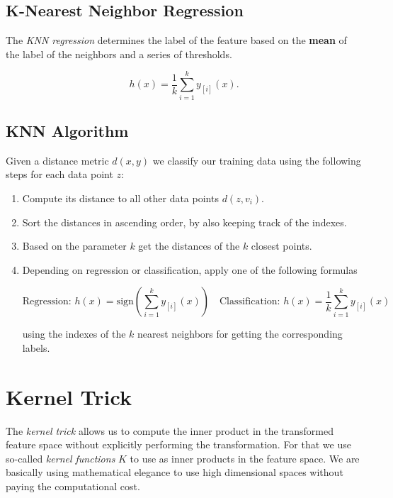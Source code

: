 \subsection{K-Nearest Neighbor Regression}

The \emph{KNN regression} determines the label of the feature based on the \textbf{mean} of the
label of the neighbors and a series of thresholds.

\[
	h(x) = \frac{1}{k} \sum_{i = 1}^{k} y_{[i]}(x).
\]

\subsection{KNN Algorithm}

Given a distance metric \(d(x, y)\) we classify our training data using the following steps for each data point \(z\):

\begin{enumerate}

	\item Compute its distance to all other data points \(d(z, v_i)\).

	\item Sort the distances in ascending order, by also keeping track of the indexes.

	\item Based on the parameter \(k\) get the distances of the \(k\) closest points.

	\item Depending on regression or classification, apply one of the following formulas

	      \[
		      \mathrm{Regression:}\, h(x) = \mathrm{sign} \left(\sum_{i = 1}^{k} y_{[i]}(x)\right) \quad \mathrm{Classification:}\, h(x) = \frac{1}{k} \sum_{i = 1}^{k} y_{[i]}(x)
	      \]

	      using the indexes of the \(k\) nearest neighbors for getting the corresponding labels.

\end{enumerate}

\section{Kernel Trick}

The \emph{kernel trick} allows us to compute the inner product in the transformed feature space without explicitly performing the transformation.
For that we use so-called \emph{kernel functions} \(K\) to use as inner products in the feature space. We are basically using
mathematical elegance to use high dimensional spaces without paying the computational cost.

